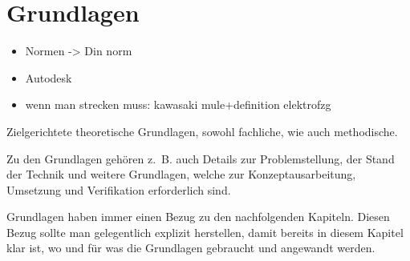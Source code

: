 \chapter{Grundlagen}
\label{cha:Grundlagen}

	\begin{itemize}
		\item Normen -> Din norm
		\item Autodesk
		\item wenn man strecken muss: kawasaki mule+definition elektrofzg
		\end{itemize}
Zielgerichtete theoretische Grundlagen, sowohl fachliche, wie auch methodische.

Zu den Grundlagen gehören z.~B. auch Details zur Problemstellung, der Stand der Technik und weitere Grundlagen, welche zur Konzeptausarbeitung, Umsetzung und Verifikation erforderlich sind.

Grundlagen haben immer einen Bezug zu den nachfolgenden Kapiteln. Diesen Bezug sollte man gelegentlich explizit herstellen, damit bereits in diesem Kapitel klar ist, wo und für was die Grundlagen gebraucht und angewandt werden.